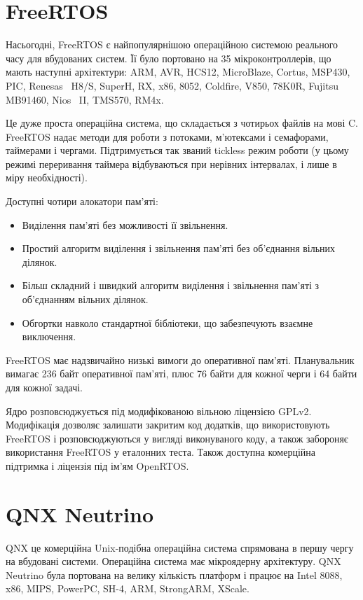 \documentclass[oneside,14pt,a4paper,final]{myextreport}
\begin{document}
\section{FreeRTOS}

Насьогодні, FreeRTOS\cite{freertos} є найпопулярнішою операційною системою реального часу для вбудованих систем\cite{freertos:popular}. Її було портовано на 35 мікроконтроллерів, що мають наступні архітектури: ARM, AVR, HCS12, MicroBlaze, Cortus, MSP430, PIC, Renesas~ H8/S, SuperH, RX, x86, 8052, Coldfire, V850, 78K0R, Fujitsu MB91460, Nios~ II, TMS570, RM4x.

Це дуже проста операційна система, що складається з чотирьох файлів на мові C. FreeRTOS надає методи для роботи з потоками, м'ютексами і семафорами, таймерами і чергами. Підтримується так званий tickless режим роботи (у цьому режимі переривання таймера відбуваються при нерівних інтервалах, і лише в міру необхідності).

Доступні чотири алокатори пам'яті:
\begin{itemize}
  \item Виділення пам'яті без можливості її звільнення.
  \item Простий алгоритм виділення і звільнення пам'яті без об'єднання вільних ділянок.
  \item Більш складний і швидкий алгоритм виділення і звільнення пам'яті з об'єднанням вільних ділянок.
  \item Обгортки навколо стандартної бібліотеки, що забезпечують взаємне виключення.
\end{itemize}

FreeRTOS має надзвичайно низькі вимоги до оперативної пам'яті. Планувальник вимагає 236 байт оперативної пам'яті, плюс 76 байти для кожної черги і 64 байти для кожної задачі.

Ядро розповсюджується під модифікованою вільною ліцензією GPLv2\cite{freertos:license}. Модифікація дозволяє залишати закритим код додатків, що використовують FreeRTOS і розповсюджуються у вигляді виконуваного коду, а також забороняє використання FreeRTOS у еталонних теста. Також доступна комерційна підтримка і ліцензія під ім'ям OpenRTOS\cite{openrtos}.

\section{QNX Neutrino}

QNX\cite{qnx} це комерційна Unix-подібна операційна система спрямована в першу чергу на вбудовані системи. Операційна система має мікроядерну архітектуру. QNX Neutrino була портована на велику кількість платформ і працює на Intel 8088, x86, MIPS, PowerPC, SH-4, ARM, StrongARM, XScale.
\end{document}
